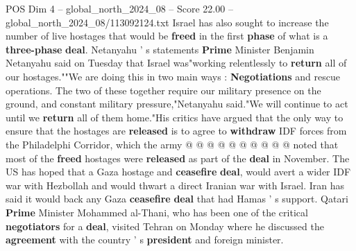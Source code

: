 \begin{textsample}{POS Dim 4 – global\_north\_2024\_08 – Score 22.00 – global\_north\_2024\_08/113092124.txt}
Israel has also sought to increase the number of live hostages that would be \textbf{freed} in the first \textbf{phase} of what is a \textbf{three-phase} \textbf{deal}.
Netanyahu ' s statements \textbf{Prime} Minister Benjamin Netanyahu said on Tuesday that Israel was"working relentlessly to \textbf{return} all of our hostages.""We are doing this in two main ways : \textbf{Negotiations} and rescue operations.
The two of these together require our military presence on the ground, and constant military pressure,"Netanyahu said."We will continue to act until we \textbf{return} all of them home."His critics have argued that the only way to ensure that the hostages are \textbf{released} is to agree to \textbf{withdraw} IDF forces from the Philadelphi Corridor, which the army @ @ @ @ @ @ @ @ @ @ noted that most of the \textbf{freed} hostages were \textbf{released} as part of the \textbf{deal} in November.
The US has hoped that a Gaza hostage and \textbf{ceasefire} \textbf{deal}, would avert a wider IDF war with Hezbollah and would thwart a direct Iranian war with Israel.
Iran has said it would back any Gaza \textbf{ceasefire} \textbf{deal} that had Hamas ' s support.
Qatari \textbf{Prime} Minister Mohammed al-Thani, who has been one of the critical \textbf{negotiators} for a \textbf{deal}, visited Tehran on Monday where he discussed the \textbf{agreement} with the country ' s \textbf{president} and foreign minister.

\end{textsample}
